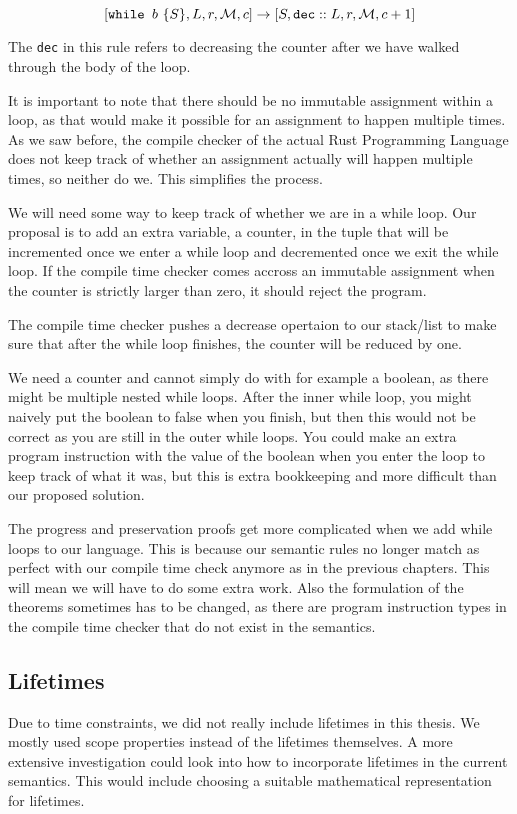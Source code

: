 $$[ \texttt{while } b~ \{ S \}, L, r, \mathcal{M}, c ] \to [ S, \texttt{dec}::L, r, \mathcal{M}, c+1 ]$$

The \texttt{dec} in this rule refers to decreasing the counter after we have walked through the body of the loop.

It is important to note that there should be no immutable assignment within a loop, as that would make it possible for an assignment to happen multiple times. As we saw before, the compile checker of the actual Rust Programming Language does not keep track of whether an assignment actually will happen multiple times, so  neither do we. This simplifies the process. 

We will need some way to keep track of whether we are in a while loop. Our proposal is to add an extra variable, a counter, in the tuple that will be incremented once we enter a while loop and decremented once we exit the while loop. If the compile time checker comes accross an immutable assignment when the counter is strictly larger than zero, it should reject the program. 

The compile time checker pushes a decrease opertaion to our stack/list to make sure that after the while loop finishes, the counter will be reduced by one. 

We need a counter and cannot simply do with for example a boolean, as there might be multiple nested while loops. After the inner while loop, you might naively put the boolean to false when you finish, but then this would not be correct as you are still in the outer while loops. You could make an extra program instruction with the value of the boolean when you enter the loop to keep track of what it was, but this is extra bookkeeping and more difficult than our proposed solution.

The progress and preservation proofs get more complicated when we add while loops to our language. This is because our semantic rules no longer match as perfect with our compile time check anymore as in the previous chapters. This will mean we will have to do some extra work. Also the formulation of the theorems sometimes has to be changed, as there are program instruction types in the compile time checker that do not exist in the semantics. 

\subsection{Lifetimes}
Due to time constraints, we did not really include lifetimes in this thesis. We mostly used scope properties instead of the lifetimes themselves. A more extensive investigation could look into how to incorporate lifetimes in the current semantics. This would include choosing a suitable mathematical representation for lifetimes. 

